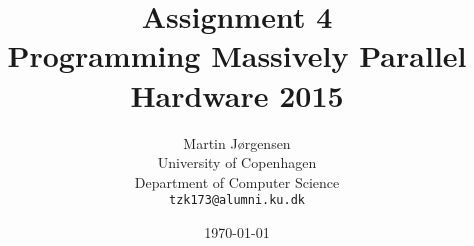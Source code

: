 \documentclass[a4paper,11pt]{article}
\title{\textbf{Assignment 4} \\ Programming Massively Parallel Hardware 2015}
\author
{
    Martin Jørgensen \\
    University of Copenhagen \\
    Department of Computer Science \\
    {\tt tzk173@alumni.ku.dk}
}
\date{\today}
\begin{document}
\maketitle

\tableofcontents
\pagebreak


%









\appendix


\end{document}
